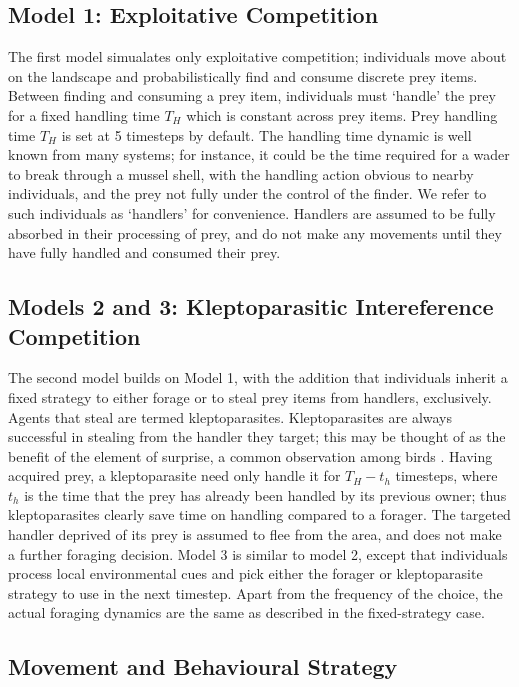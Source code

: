 \documentclass[11pt]{article}
\begin{document}
\subsection{Model 1: Exploitative Competition}

The first model simualates only exploitative competition; individuals move about on the landscape and probabilistically find and consume discrete prey items.
Between finding and consuming a prey item, individuals must `handle' the prey for a fixed handling time $T_H$ which is constant across prey items.
Prey handling time $T_H$ is set at 5 timesteps by default.
The handling time dynamic is well known from many systems; for instance, it could be the time required for a wader to break through a mussel shell, with the handling action obvious to nearby individuals, and the prey not fully under the control of the finder.
We refer to such individuals as `handlers' for convenience.
Handlers are assumed to be fully absorbed in their processing of prey, and do not make any movements until they have fully handled and consumed their prey.

\subsection{Models 2 and 3: Kleptoparasitic Intereference Competition}

The second model builds on Model 1, with the addition that individuals inherit a fixed strategy to either forage or to steal prey items from handlers, exclusively.
Agents that steal are termed kleptoparasites.
Kleptoparasites are always successful in stealing from the handler they target; this may be thought of as the benefit of the element of surprise, a common observation among birds \cite{brockmann1979}.
Having acquired prey, a kleptoparasite need only handle it for $T_H - t_h$ timesteps, where $t_h$ is the time that the prey has already been handled by its previous owner; thus kleptoparasites clearly save time on handling compared to a forager.
The targeted handler deprived of its prey is assumed to flee from the area, and does not make a further foraging decision.
Model 3 is similar to model 2, except that individuals process local environmental cues and pick either the forager or kleptoparasite strategy to use in the next timestep.
Apart from the frequency of the choice, the actual foraging dynamics are the same as described in the fixed-strategy case.

\subsection{Movement and Behavioural Strategy}
\end{document}
